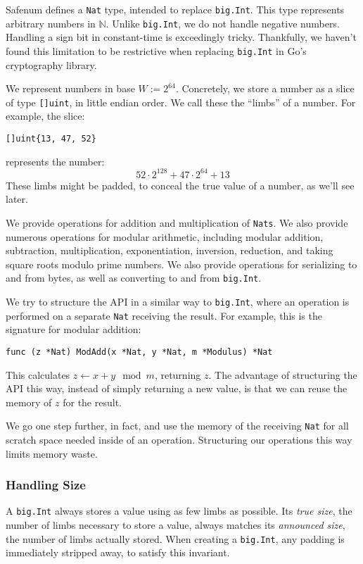 \documentclass[11pt, a4paper]{article} %
\begin{document}
{Safenum defines a \texttt{Nat} type, intended to
replace \texttt{big.Int}. This type represents arbitrary
numbers in $\mathbb{N}$. Unlike \texttt{big.Int}, we do not handle
negative numbers. Handling a sign bit in constant-time is exceedingly
tricky. Thankfully, we haven't found this limitation to be restrictive
when replacing \texttt{big.Int} in Go's cryptography library.

We represent numbers in base $W := 2^{64}$. Concretely, we
store a number as a slice of type \texttt{[]uint}, in little
endian order. We call these the \enquote{limbs} of a number. For example,
the slice:
\begin{verbatim}
[]uint{13, 47, 52}
\end{verbatim}
represents the number:
$$
52 \cdot 2^{128} + 47 \cdot 2^{64} + 13
$$
These limbs might be padded, to conceal the true value of a number,
as we'll see later.

We provide operations for addition and multiplication of \texttt{Nats}.
We also provide numerous operations
for modular arithmetic, including modular addition, subtraction,
multiplication, exponentiation, inversion, reduction, and taking
square roots modulo prime numbers. We also provide operations
for serializing to and from bytes, as well as converting
to and from \texttt{big.Int}.

We try to structure the API in a similar way to \texttt{big.Int},
where an operation is performed on a separate
\texttt{Nat} receiving the result.
For example, this is the signature for
modular addition:

\begin{verbatim}
func (z *Nat) ModAdd(x *Nat, y *Nat, m *Modulus) *Nat
\end{verbatim}

This calculates $z \leftarrow x + y \mod m$, returning $z$. The advantage
of structuring the API this way, instead of simply returning a new
value, is that we can reuse the memory of $z$ for the result.

We go one step further, in fact, and use the memory of the receiving
\texttt{Nat} for all scratch space needed inside of an operation.
Structuring our operations this way limits memory waste.

\subsubsection{Handling Size}

A \texttt{big.Int} always stores a value using as few limbs
as possible. Its \textit{true size}, the number of limbs
necessary to store a value, always matches its \textit{announced size},
the number of limbs actually stored. When creating
a \texttt{big.Int}, any padding is immediately stripped away,
to satisfy this invariant.

}
\end{document}

